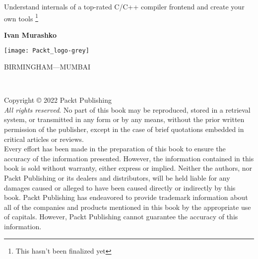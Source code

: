 \pagestyle{empty}
\nopagecolor
\begin{flushleft}

\fontsize{35}{40}

\vspace{0.3 cm}

\Large {\itshape }

\vspace{3 cm}
{\Large Understand internals of a top-rated C/C++ compiler frontend and create
  your own tools }\footnote{This hasn't been finalized yet}

\vspace{3 cm}

\large \textbf {Ivan Murashko}\\

\vspace{4 cm}

\texttt{[image: Packt\_logo-grey]}

{\small BIRMINGHAM—MUMBAI}
\newpage

\\
\vspace{0.15 cm}
\large{\itshape }

\vspace{0.3 cm}
\normalsize{
Copyright © 2022 Packt Publishing\\
\vspace{0.3 cm}
{\itshape All rights reserved}. No part of this book may be reproduced, stored in a retrieval system,
or transmitted in any form or by any means, without the prior written permission of the
publisher, except in the case of brief quotations embedded in critical articles or reviews.\\
\vspace{0.15 cm}
Every effort has been made in the preparation of this book to ensure the accuracy of the
information presented. However, the information contained in this book is sold without
warranty, either express or implied. Neither the authors, nor Packt Publishing or its
dealers and distributors, will be held liable for any damages caused or alleged to have
been caused directly or indirectly by this book.
\vspace{0.15 cm}
Packt Publishing has endeavored to provide trademark information about all of the
companies and products mentioned in this book by the appropriate use of capitals.
However, Packt Publishing cannot guarantee the accuracy of this information.

}
\end{flushleft}
